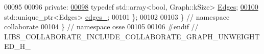\begin{DoxyCode}
00095 
00096  \textcolor{keyword}{private}:
\hyperlink{classosse_1_1collaborate_1_1_graph_unweighted_a218e4872b092090509bc2483186de31a}{00098}   \textcolor{keyword}{typedef} std::array<bool, Graph::kSize> \hyperlink{classosse_1_1collaborate_1_1_graph_unweighted_a218e4872b092090509bc2483186de31a}{Edges};
\hyperlink{classosse_1_1collaborate_1_1_graph_unweighted_ae1e5841b64a17371fbbf2dfffe396b45}{00100}   std::unique\_ptr<Edges> \hyperlink{classosse_1_1collaborate_1_1_graph_unweighted_ae1e5841b64a17371fbbf2dfffe396b45}{edges\_};
00101 \};
00102 
00103 \}  \textcolor{comment}{// namespace collaborate}
00104 \}  \textcolor{comment}{// namespace osse}
00105 
00106 \textcolor{preprocessor}{#endif  // LIBS\_COLLABORATE\_INCLUDE\_COLLABORATE\_GRAPH\_UNWEIGHTED\_H\_}
\end{DoxyCode}
